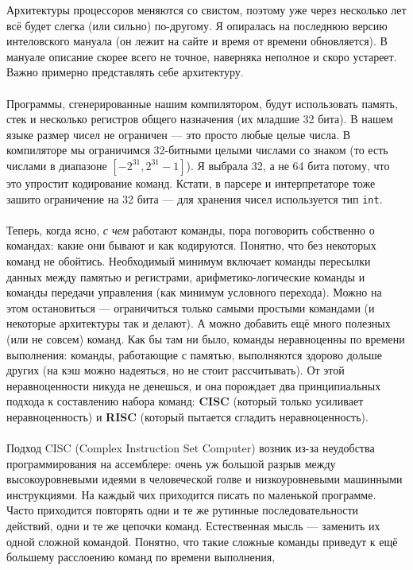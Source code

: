 \documentclass[11pt]{book}
\begin{document}
Архитектуры процессоров меняются со свистом, поэтому уже через несколько лет всё будет слегка (или сильно) по-другому.
Я опиралась на последнюю версию интеловского мануала (он лежит на сайте и время от времени обновляется).
В мануале описание скорее всего не точное, наверняка неполное и скоро устареет.
Важно примерно представлять себе архитектуру.
\\ \\
Программы, сгенерированные нашим компилятором, будут использовать память, стек и несколько регистров общего назначения (их младшие 32 бита).
В нашем языке размер чисел не ограничен --- это просто любые целые числа.
В компиляторе мы ограничимся 32-битными целыми числами со знаком (то есть числами в диапазоне $[- 2^{31}, 2^{31} - 1]$).
Я выбрала 32, а не 64 бита потому, что это упростит кодирование команд.
Кстати, в парсере и интерпретаторе тоже зашито ограничение на 32 бита --- для хранения чисел используется тип \texttt{int}.
\\ \\
Теперь, когда ясно, \emph{с чем} работают команды, пора поговорить собственно о командах: какие они бывают и как кодируются.
Понятно, что без некоторых команд не обойтись.
Необходимый минимум включает команды пересылки данных между памятью и регистрами,
арифметико-логические команды
и команды передачи управления (как минимум условного перехода).
Можно на этом остановиться --- ограничиться только самыми простыми командами (и некоторые архитектуры так и делают).
А можно добавить ещё много полезных (или не совсем) команд.
Как бы там ни было, команды неравноценны по времени выполнения:
команды, работающие с памятью, выполняются здорово дольше других (на кэш можно надеяться, но не стоит рассчитывать).
От этой неравноценности никуда не денешься, и она порождает два принципиальных подхода к составлению набора команд:
\textbf{CISC} (который только усиливает неравноценность) и \textbf{RISC} (который пытается сгладить неравноценность).
\\ \\
Подход CISC (Complex Instruction Set Computer) возник из-за неудобства программирования на ассемблере:
очень уж большой разрыв между высокоуровневыми идеями в человеческой голве и низкоуровневыми машинными инструкциями.
На каждый чих приходится писать по маленькой программе.
Часто приходится повторять одни и те же рутинные последовательности действий, одни и те же цепочки команд.
Естественная мысль --- заменить их одной сложной командой.
Понятно, что такие сложные команды приведут к ещё большему расслоению команд по времени выполнения,
\end{document}
